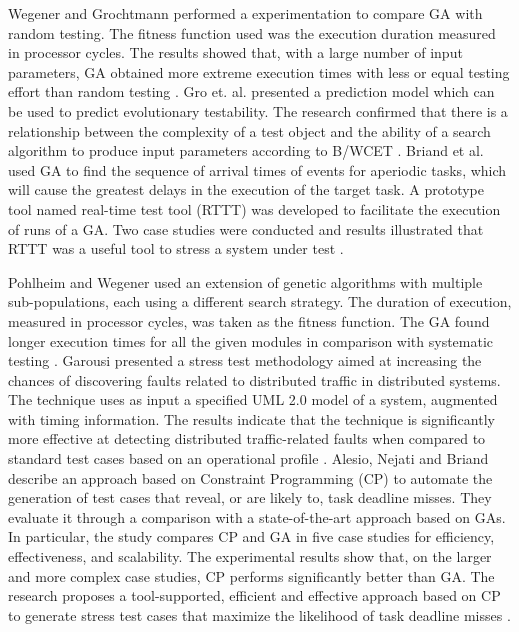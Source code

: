 \documentclass{report}
\begin{document}
Wegener and Grochtmann performed a  experimentation
to compare GA with random testing. The fitness function used was the execution duration measured in processor cycles.  The results showed that, with a large number of input parameters, GA obtained more extreme execution times with less or equal testing effort than random testing \cite{J.WegenerK.GrimmM.GrochtmannH.Sthamer1996} \cite{Wegener1998}. Gro et. al. \cite{Gross2000} presented a prediction model  which can be used to predict evolutionary testability. The research confirmed that there is a relationship between the complexity of a test object and the ability of a search algorithm to produce input parameters according to B/WCET \cite{Gross2000}. Briand et al. \cite{Briand2005} used GA to find the sequence of arrival times of events for aperiodic tasks, which will cause the greatest delays in the execution of the target task. A prototype tool named real-time test tool (RTTT) was developed to facilitate the execution of runs of a GA. Two case studies were conducted and results illustrated that RTTT was a useful tool to stress a system under test \cite{Briand2005}.


Pohlheim and Wegener used an extension of genetic algorithms with multiple sub-populations, each using a different search strategy. The duration of execution, measured in processor cycles, was taken as the fitness
function. The GA found longer execution times for all the given modules in comparison with systematic testing \cite{Pohlheim2005}. Garousi presented a stress test methodology aimed at increasing the chances of discovering faults related to distributed traffic in distributed systems. The technique uses as input a specified UML 2.0 model of a system, augmented with timing information. The results indicate that the technique is significantly more effective at detecting distributed traffic-related faults when compared to standard test cases based on an operational profile \cite{Garousi2006}. Alesio, Nejati and Briand describe an approach based
on Constraint Programming (CP) to automate the generation of test cases that reveal, or are likely to, task deadline misses. They evaluate it through a comparison with a state-of-the-art approach based on GAs. In particular, the study compares CP and GA in five case studies for efficiency, effectiveness, and scalability. The experimental results show that, on the larger and more complex case studies, CP performs significantly better than GA. The research proposes a tool-supported, efficient and effective approach based on CP to generate stress test cases that maximize the likelihood of task deadline misses \cite{DiAlesio2013}.
\end{document}
